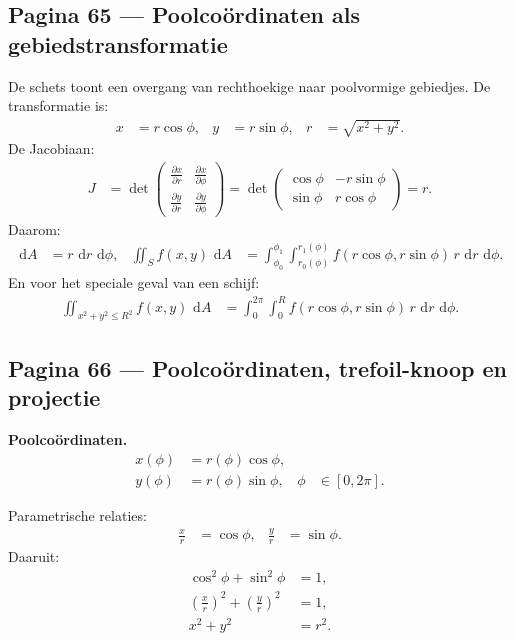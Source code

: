 \documentclass[11pt]{article}
\newcommand{\dd}{\,\mathrm{d}}
\newcommand{\pd}[2]{\frac{\partial #1}{\partial #2}}
\begin{document}
\subsection*{Pagina 65 --- Poolcoördinaten als gebiedstransformatie}

De schets toont een overgang van rechthoekige naar poolvormige gebiedjes. De transformatie is:
\begin{align*}
x&=r\cos\phi,
&
y&=r\sin\phi,
&
r&=\sqrt{x^2+y^2}.
\end{align*}
De Jacobiaan:
\begin{align*}
J
&=
\det
\begin{pmatrix}
\pd{x}{r} & \pd{x}{\phi}\\
\pd{y}{r} & \pd{y}{\phi}
\end{pmatrix}
=
\det
\begin{pmatrix}
\cos\phi & -r\sin\phi\\
\sin\phi & r\cos\phi
\end{pmatrix}
=
r.
\end{align*}
Daarom:
\begin{align*}
\dd A
&=
r\,\dd r\,\dd\phi,
&
\iint_S f(x,y)\,\dd A
&=
\int_{\phi_0}^{\phi_1}\int_{r_0(\phi)}^{r_1(\phi)}
f(r\cos\phi,r\sin\phi)\,r\,\dd r\,\dd\phi.
\end{align*}
En voor het speciale geval van een schijf:
\begin{align*}
\iint_{x^2+y^2\le R^2} f(x,y)\,\dd A
&=
\int_0^{2\pi}\int_0^R
f(r\cos\phi,r\sin\phi)\,r\,\dd r\,\dd\phi.
\end{align*}

\subsection*{Pagina 66 --- Poolcoördinaten, trefoil-knoop en projectie}

\textbf{Poolcoördinaten.}
\begin{align*}
x(\phi) &= r(\phi)\cos\phi,\\
y(\phi) &= r(\phi)\sin\phi,
&
\phi &\in [0,2\pi].
\end{align*}

Parametrische relaties:
\begin{align*}
\frac{x}{r} &= \cos\phi,
&
\frac{y}{r} &= \sin\phi.
\end{align*}
Daaruit:
\begin{align*}
\cos^2\phi+\sin^2\phi &= 1,\\
\left(\frac{x}{r}\right)^2+
\left(\frac{y}{r}\right)^2 &=1,\\
x^2+y^2&=r^2.
\end{align*}
\end{document}

